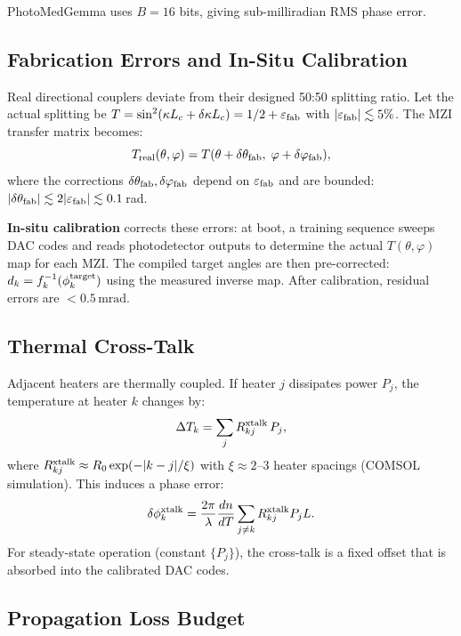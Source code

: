 \documentclass[12pt, a4paper]{article}
\begin{document}
PhotoMedGemma uses $B=16$ bits, giving sub-milliradian RMS phase error.

\subsection{Fabrication Errors and In-Situ Calibration}

Real directional couplers deviate from their designed 50:50 splitting ratio.
Let the actual splitting be $T = \sin^2(\kappa L_c + \delta\kappa L_c)
= 1/2 + \varepsilon_{\rm fab}$ with $|\varepsilon_{\rm fab}|\lesssim5\%$.
The MZI transfer matrix becomes:
\begin{equation}
  T_{\rm real}(\theta,\varphi)
  = T(\theta + \delta\theta_{\rm fab},\; \varphi + \delta\varphi_{\rm fab}),
  \label{eq:fab_error}
\end{equation}
where the corrections $\delta\theta_{\rm fab},\delta\varphi_{\rm fab}$
depend on $\varepsilon_{\rm fab}$ and are bounded:
$|\delta\theta_{\rm fab}| \lesssim 2|\varepsilon_{\rm fab}| \lesssim 0.1$\,rad.

\textbf{In-situ calibration} corrects these errors:
at boot, a training sequence sweeps DAC codes and reads photodetector
outputs to determine the actual $T(\theta,\varphi)$ map for each MZI.
The compiled target angles are then pre-corrected:
$d_k = f^{-1}_k(\phi_k^{\rm target})$ using the measured inverse map.
After calibration, residual errors are $<0.5\,\mathrm{mrad}$.

\subsection{Thermal Cross-Talk}

Adjacent heaters are thermally coupled.
If heater $j$ dissipates power $P_j$, the temperature at heater $k$ changes by:
\begin{equation}
  \Delta T_k = \sum_j R^{\rm xtalk}_{kj}\,P_j,
  \label{eq:xtalk}
\end{equation}
where $R^{\rm xtalk}_{kj}\approx R_0\exp(-|k-j|/\xi)$ with
$\xi\approx2$--$3$ heater spacings (COMSOL simulation).
This induces a phase error:
\begin{equation}
  \delta\phi_k^{\rm xtalk} = \frac{2\pi}{\lambda}\frac{dn}{dT}
  \sum_{j\neq k} R^{\rm xtalk}_{kj} P_j L.
\end{equation}
For steady-state operation (constant $\{P_j\}$), the cross-talk is a fixed
offset that is absorbed into the calibrated DAC codes.

\subsection{Propagation Loss Budget}
\end{document}
